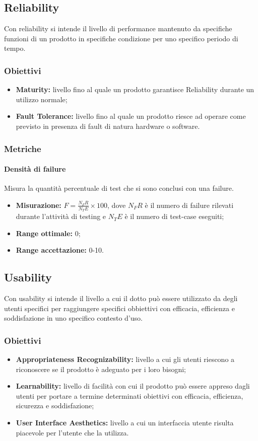 	\subsection{Reliability}
		Con reliability si intende il livello di performance mantenuto da specifiche funzioni di un prodotto in specifiche condizione per uno specifico periodo di tempo.
		\subsubsection{Obiettivi}
		\begin{itemize}
			\item {\textbf{Maturity:} livello fino al quale un prodotto garantisce Reliability durante un utilizzo normale;}
			\item {\textbf{Fault Tolerance:} livello fino al quale un prodotto riesce ad operare come previsto in presenza di fault di natura hardware o software.}
		\end{itemize}
		\subsubsection{Metriche}
			\paragraph{Densità di failure} \Spazio
			Misura la quantità percentuale di test che si sono conclusi con una failure.
			\begin{itemize}
				\item {\textbf{Misurazione:} $F=\frac{N_FR}{N_TE}\times 100$, dove $N_FR$ è il numero di failure rilevati durante l'attività di testing e $N_TE$ è il numero di test-case eseguiti};
				\item {\textbf{Range ottimale:} 0;}
				\item {\textbf{Range accettazione:} 0-10.}
			\end{itemize} 
			
	\subsection{Usability}
		Con usability si intende il livello a cui il dotto può essere utilizzato da degli utenti specifici per raggiungere specifici obbiettivi con efficacia, efficienza e soddisfazione in uno specifico contesto d'uso.  
		\subsubsection{Obiettivi}
		\begin{itemize}
			\item {\textbf{Appropriateness Recognizability:} livello a cui gli utenti riescono a riconoscere se il prodotto è adeguato per i loro bisogni;}
			\item {\textbf{Learnability:} livello di facilità con cui il prodotto può essere appreso dagli utenti per portare a termine determinati obiettivi con efficacia, efficienza, sicurezza e soddisfazione;} 
			\item {\textbf{User Interface Aesthetics:} livello a cui un interfaccia utente risulta piacevole per l'utente che la utilizza. }
			
		\end{itemize}
